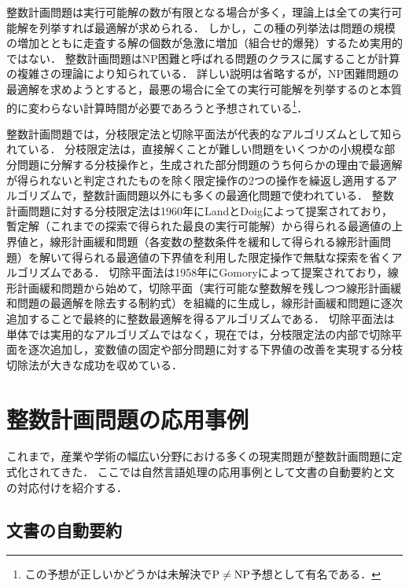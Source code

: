 \documentclass[japanese]{jnlp_1.4}
\begin{document}
整数計画問題は実行可能解の数が有限となる場合が多く，理論上は全ての実行可能解を列挙すれば最適解が求められる．
しかし，この種の列挙法は問題の規模の増加とともに走査する解の個数が急激に増加（組合せ的爆発）するため実用的ではない．
整数計画問題はNP困難と呼ばれる問題のクラスに属することが計算の複雑さの理論により知られている．
詳しい説明は省略するが，NP困難問題の最適解を求めようとすると，最悪の場合に全ての実行可能解を列挙するのと本質的に変わらない計算時間が必要であろうと予想されている\footnote{この予想が正しいかどうかは未解決で$\textnormal{P} \not= \textnormal{NP}$予想として有名である．}．

整数計画問題では，分枝限定法と切除平面法が代表的なアルゴリズムとして知られている．
分枝限定法は，直接解くことが難しい問題をいくつかの小規模な部分問題に分解する分枝操作と，生成された部分問題のうち何らかの理由で最適解が得られないと判定されたものを除く限定操作の2つの操作を繰返し適用するアルゴリズムで，整数計画問題以外にも多くの最適化問題で使われている．
整数計画問題に対する分枝限定法は1960年にLandとDoigによって提案されており，暫定解（これまでの探索で得られた最良の実行可能解）から得られる最適値の上界値と，線形計画緩和問題（各変数の整数条件を緩和して得られる線形計画問題）を解いて得られる最適値の下界値を利用した限定操作で無駄な探索を省くアルゴリズムである．
切除平面法は1958年にGomoryによって提案されており，線形計画緩和問題から始めて，切除平面（実行可能な整数解を残しつつ線形計画緩和問題の最適解を除去する制約式）を組織的に生成し，線形計画緩和問題に逐次追加することで最終的に整数最適解を得るアルゴリズムである．
切除平面法は単体では実用的なアルゴリズムではなく，現在では，分枝限定法の内部で切除平面を逐次追加し，変数値の固定や部分問題に対する下界値の改善を実現する分枝切除法が大きな成功を収めている．


\section{整数計画問題の応用事例}
\label{sec:application}

これまで，産業や学術の幅広い分野における多くの現実問題が整数計画問題に定式化されてきた．
ここでは自然言語処理の応用事例として文書の自動要約\cite{FilatovaE2004,GillickD2009,HiraoT2009,McDonaldR2007,NishikawaH2013,TakamuraH2008}と文の対応付け\cite{NishinoM2013,NishinoM2014}を紹介する．


\subsection{文書の自動要約}
\label{sec:document-summarization}
\end{document}

